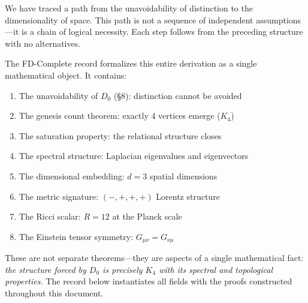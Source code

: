 \documentclass[11pt,a4paper]{book}
\def\texttt#1{#1}%
\begin{document}
We have traced a path from the unavoidability of distinction to the dimensionality of space. 
This path is not a sequence of independent assumptions—it is a chain of logical necessity. 
Each step follows from the preceding structure with no alternatives.

The \texttt{FD-Complete} record formalizes this entire derivation as a single mathematical 
object. It contains:
\begin{enumerate}
\item The unavoidability of $D_0$ (§8): distinction cannot be avoided
\item The genesis count theorem: exactly 4 vertices emerge ($K_4$)
\item The saturation property: the relational structure closes
\item The spectral structure: Laplacian eigenvalues and eigenvectors
\item The dimensional embedding: $d=3$ spatial dimensions
\item The metric signature: $(-, +, +, +)$ Lorentz structure
\item The Ricci scalar: $R = 12$ at the Planck scale
\item The Einstein tensor symmetry: $G_{\mu\nu} = G_{\nu\mu}$
\end{enumerate}

These are not separate theorems—they are aspects of a single mathematical fact: 
\emph{the structure forced by $D_0$ is precisely $K_4$ with its spectral and topological 
properties.} The record below instantiates all fields with the proofs constructed throughout 
this document.
\end{document}
